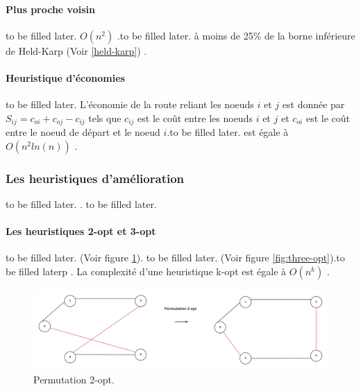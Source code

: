 \paragraph{Plus proche voisin}
\label{par:nn}to be filled later. $O(n^2)$ \parencite{rosenkrantz_analysis_1977}.to be filled later. à moins de 25\% de la borne inférieure de Held-Karp (Voir \ref{held-karp}) \parencite{johnson_table_1995}.


\medskip


\paragraph{Heuristique d'économies}to be filled later. L'économie de la route reliant les noeuds $i$ et $j$ est donnée par $S_{ij} = c_{oi} + c_{oj} - c_{ij}$ tels que $c_{ij}$ est le coût entre les noeuds $i$ et $j$ et $c_{oi}$ est le coût entre le noeud de départ et le noeud $i$.to be filled later. est égale à $O(n^2ln(n))$ \parencite{golden_approximate_1980}. 

\medskip

\subsubsection{Les heuristiques d'amélioration}to be filled later. \parencite{anbuudayasankar_survey_2014}. to be filled later.


\paragraph{Les heuristiques 2-opt et 3-opt}to be filled later. (Voir figure \ref{fig:two-opt}). to be filled later. (Voir figure \ref{fig:three-opt}).to be filled laterp \parencite{davendra_traveling_2010}. La complexité d'une heuristique k-opt est égale à $O(n^k)$ \parencite{golden_approximate_1980}.

\begin{figure}[hbt!]
  \centering
  \includegraphics[width=15cm]{images_pfe/TWO_OPT.png}
  \caption{Permutation 2-opt.}
  \label{fig:two-opt}
\end{figure}
\FloatBarrier

